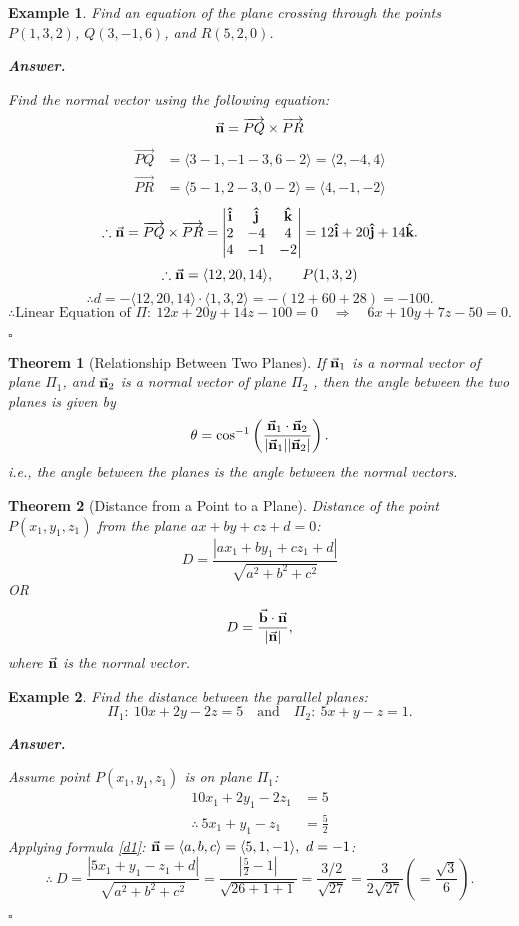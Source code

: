 \documentclass[12pt,a4paper]{article}
\newtheorem{thm}{Theorem}[subsection]
\newtheorem{eg}{Example}[subsection]
\newenvironment*{ans}{\par\indent\textbf{\textit{Answer. }}\par}{\par\hfill{$\square$}\par}
\def\vecb{\va{b}}
\def\vecn{\va{n}}
\def\veci{\vu{\boldsymbol{\textbf{i}}}}
\def\vecj{\vu{\boldsymbol{\textbf{j}}}}
\def\veck{\vu{\boldsymbol{\textbf{k}}}}
\begin{document}
\begin{eg}
	Find an equation of the plane crossing through the points $P(1,3,2)$, $Q(3,-1,6)$, and $R(5,2,0)$.
	\begin{ans}
		Find the normal vector using the following equation: \[\vecn=\overrightarrow{PQ}\times\overrightarrow{PR}\]
		\[\begin{aligned}
			\overrightarrow{PQ}&=\langle3-1,-1-3,6-2\rangle=\langle2,-4,4\rangle\\
			\overrightarrow{PR}&=\langle5-1,2-3,0-2\rangle=\langle4,-1,-2\rangle
		\end{aligned}\]
		\[\therefore\vecn=\overrightarrow{PQ}\times\overrightarrow{PR}=\left|\begin{matrix}\veci&\vecj&\veck\\2&-4&4\\4&-1&-2\end{matrix}\right|=12\veci+20\vecj+14\veck.\]
		\[\therefore \vecn=\langle12,20,14\rangle,\qquad P(1,3,2)\]
		\[\therefore d=-\langle12,20,14\rangle\cdot\langle1,3,2\rangle=-(12+60+28)=-100.\]
		\[\therefore \text{Linear Equation of } \Pi:\  12x+20y+14z-100=0\quad\Longrightarrow\quad6x+10y+7z-50=0.\]
	\end{ans}
\end{eg}
\begin{thm}[Relationship Between Two Planes]
	If $\vecn_1$ is a normal vector of plane $\Pi_1$, and $\vecn_2$ is a normal vector of plane $\Pi_2$	, then the angle between the two planes is given by \[\theta=\cos^{-1}\left(\frac{\vecn_1\cdot\vecn_2}{|\vecn_1||\vecn_2|}\right).\]
	i.e., the angle between the planes is the angle between the normal vectors. 
\end{thm}
\begin{thm}[Distance from a Point to a Plane]
	Distance of the point $P(x_1,y_1,z_1)$ from the plane $ax+by+cz+d=0$: 
	\begin{equation}\label{d1}
		D=\frac{|ax_1+by_1+cz_1+d|}{\sqrt{a^2+b^2+c^2}} 	
	\end{equation}
	OR
	\begin{equation}\label{d2}
	D=\frac{\vecb\cdot\vecn}{|\vecn|}, 	
	\end{equation}
	where $\vecn$ is the normal vector. 
\end{thm}
\begin{eg}
	Find the distance between the parallel planes: \[\Pi_1:\ 10x+2y-2z=5\quad\text{and}\quad\Pi_2:\ 5x+y-z=1.\]
	\begin{ans}
		Assume point $P(x_1,y_1,z_1)$ is on plane $\Pi_1$: \[\begin{aligned}10x_1+2y_1-2z_1&=5\\\therefore\ 5x_1+y_1-z_1&=\frac{5}{2}\end{aligned}\]	
		Applying formula \ref{d1}: $\vecn=\langle a,b,c\rangle=\langle5,1,-1\rangle,\ d=-1$: 
		\[\therefore\ D=\frac{|5x_1+y_1-z_1+d|}{\sqrt{a^2+b^2+c^2}}=\frac{|\frac{5}{2}-1|}{\sqrt{26+1+1}}=\frac{3/2}{\sqrt{27}}=\frac{3}{2\sqrt{27}}\left(=\frac{\sqrt{3}}{6}\right).\]
	\end{ans}
\end{eg}
\end{document}
